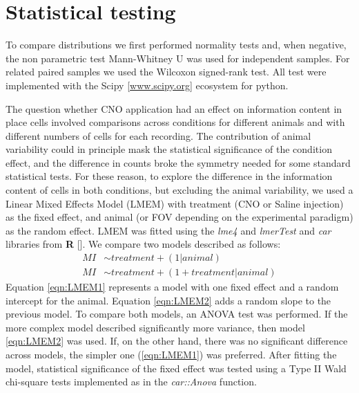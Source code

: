 \section{Statistical testing}
\label{chap3:sec:8:stats}
To compare distributions we first performed normality tests and, when negative, the non parametric test Mann-Whitney U was used for independent samples. For related paired samples we used the Wilcoxon signed-rank test. 
All test were implemented with the Scipy [\url{www.scipy.org}] ecosystem for python. 

The question whether CNO application had an effect on information content in place cells involved comparisons across conditions for different animals and with different numbers of cells for each recording.
The contribution of animal variability could in principle mask the statistical significance of the condition effect, and the difference in counts broke the symmetry needed for some standard statistical tests. 
For these reason, to explore the difference in the information content of cells in both conditions, but excluding the animal variability, we used a Linear Mixed Effects Model (LMEM) with treatment (CNO or Saline injection) as the fixed effect, and animal (or FOV depending on the experimental paradigm) as the random effect. 
LMEM was fitted using the \textit{lme4} and \textit{lmerTest} and \textit{car} libraries from \textbf{R} [\cite{Rsoftware}]. 
We compare two models described as follows:
\begin{align}
    MI & \sim treatment + (1|animal) \label{eqn:LMEM1} \\
    MI & \sim treatment + (1+treatment|animal) \label{eqn:LMEM2}
\end{align}
Equation \ref{eqn:LMEM1} represents a model with one fixed effect and a random intercept for the animal. 
Equation \ref{eqn:LMEM2} adds a random slope to the previous model. 
To compare both models, an ANOVA test was performed. If the more complex model described significantly more variance, then model \ref{eqn:LMEM2} was used.
If, on the other hand, there was no significant difference across models, the simpler one (\ref{eqn:LMEM1}) was preferred. 
After fitting the model, statistical significance of the fixed effect was tested using a Type II Wald chi-square tests implemented as in the \textit{car::Anova} function.



